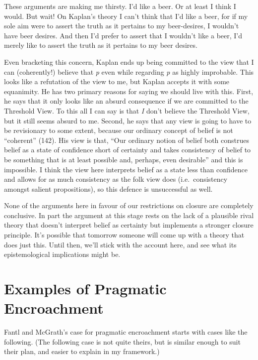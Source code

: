 \documentclass[
  10pt,
  letterpaper,
  DIV=11,
  numbers=noendperiod,
  twoside]{scrartcl}
\begin{document}
These arguments are making me thirsty. I'd like a beer. Or at least I
think I would. But wait! On Kaplan's theory I can't think that I'd like
a beer, for if my sole aim were to assert the truth as it pertains to my
beer-desires, I wouldn't have beer desires. And then I'd prefer to
assert that I wouldn't like a beer, I'd merely like to assert the truth
as it pertains to my beer desires.

Even bracketing this concern, Kaplan ends up being committed to the view
that I can (coherently!) believe that \emph{p} even while regarding
\emph{p} as highly improbable. This looks like a refutation of the view
to me, but Kaplan accepts it with some equanimity. He has two primary
reasons for saying we should live with this. First, he says that it only
looks like an absurd consequence if we are committed to the Threshold
View. To this all I can say is that \emph{I} don't believe the Threshold
View, but it still seems absurd to me. Second, he says that any view is
going to have to be revisionary to some extent, because our ordinary
concept of belief is not ``coherent'' (142). His view is that, ``Our
ordinary notion of belief both construes belief as a state of confidence
short of certainty and takes consistency of belief to be something that
is at least possible and, perhaps, even desirable'' and this is
impossible. I think the view here interprets belief as a state less than
confidence and allows for as much consistency as the folk view does
(i.e.~consistency amongst salient propositions), so this defence is
unsuccessful as well.

None of the arguments here in favour of our restrictions on closure are
completely conclusive. In part the argument at this stage rests on the
lack of a plausible rival theory that doesn't interpret belief as
certainty but implements a stronger closure principle. It's possible
that tomorrow someone will come up with a theory that does just this.
Until then, we'll stick with the account here, and see what its
epistemological implications might be.

\section{Examples of Pragmatic
Encroachment}\label{examples-of-pragmatic-encroachment}

Fantl and McGrath's case for pragmatic encroachment starts with cases
like the following. (The following case is not quite theirs, but is
similar enough to suit their plan, and easier to explain in my
framework.)
\end{document}
